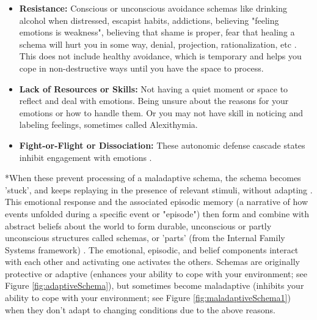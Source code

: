\documentclass[12pt,letterpaper]{article}
\begin{document}
\begin{itemize}
    \item \textbf{Resistance:} Conscious or unconscious avoidance schemas like drinking alcohol when distressed, escapist habits, addictions, believing "feeling emotions is weakness", believing that shame is proper, fear that healing a schema will hurt you in some way, denial, projection, rationalization, etc \cite{eckerUnlocking}. This does not include healthy avoidance, which is temporary and helps you cope in non-destructive ways until you have the space to process.
    \item \textbf{Lack of Resources or Skills:} Not having a quiet moment or space to reflect and deal with emotions. Being unsure about the reasons for your emotions or how to handle them. Or you may not have skill in noticing and labeling feelings, sometimes called Alexithymia.
    \item \textbf{Fight-or-Flight or Dissociation:} These autonomic defense cascade states inhibit engagement with emotions \cite{razviPSIP}.
\end{itemize}
\label{def:schemas}
*When these prevent processing of a maladaptive schema, the schema becomes 'stuck', and keeps replaying in the presence of relevant stimuli, without adapting \cite{rachmanProcessing,eckerUnlocking}. This emotional response and the associated episodic memory (a narrative of how events unfolded during a specific event or "episode") then form and combine with abstract beliefs about the world to form durable, unconscious or partly unconscious structures called schemas, or 'parts' (from the Internal Family Systems framework) \cite{laneReconsolidation,lesswrongCoherenceTherapy}. The emotional, episodic, and belief components interact with each other and activating one activates the others. Schemas are originally protective or adaptive (enhances your ability to cope with your environment; see Figure \ref{fig:adaptiveSchema}), but sometimes become maladaptive (inhibits your ability to cope with your environment; see Figure \ref{fig:maladaptiveSchema1}) when they don't adapt to changing conditions due to the above reasons.
\end{document}
